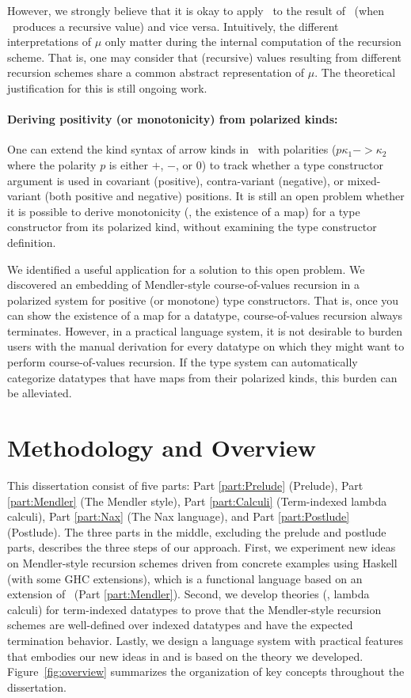 However, we strongly believe that it is okay to apply \MsfIt\ to
the result of \MPr\ (when \MPr\ produces a recursive value) and vice versa.
Intuitively, the different interpretations of $\mu$ only matter during
the internal computation of the recursion scheme. That is, one may consider
that (recursive) values resulting from different recursion schemes
share a common abstract representation of $\mu$.
The theoretical justification for this is still ongoing work.

\paragraph{Deriving positivity (or monotonicity) from polarized kinds:}
One can extend the kind syntax of arrow kinds in \Fw\ with polarities
($p\kappa_1 -> \kappa_2$ where the polarity $p$ is either $+$, $-$, or $0$)
to track whether a type constructor argument is used in
covariant (positive), contra-variant (negative), or
mixed-variant (both positive and negative) positions.
It is still an open problem whether it is possible to derive monotonicity
(\ie, the  existence of a map) for a type constructor from its polarized kind,
without examining the type constructor definition.

We identified a useful application for a solution to this open problem.
We discovered an embedding of Mendler-style course-of-values recursion in
a polarized system for positive (or monotone) type constructors.
That is, once you can show the existence of a map for a datatype,
course-of-values recursion always terminates.
However, in a practical language system, it is not desirable to burden users
with the manual derivation for every datatype on which they might want to
perform course-of-values recursion. If the type system can automatically
categorize datatypes that have maps from their polarized kinds,
this burden can be alleviated.


\section{Methodology and Overview}\label{sec:intro:overview}
This dissertation consist of five parts:
Part \ref{part:Prelude} (Prelude),
Part \ref{part:Mendler} (The Mendler style),
Part \ref{part:Calculi} (Term-indexed lambda calculi),
Part \ref{part:Nax} (The Nax language), and
Part \ref{part:Postlude} (Postlude).
The three parts in the middle, excluding the prelude and postlude parts,
describes the three steps of our approach. First, we experiment new ideas on
Mendler-style recursion schemes driven from concrete examples
using Haskell (with some GHC extensions), which is a functional language
based on an extension of \Fw\ (Part \ref{part:Mendler}). Second, we develop
theories (\ie, lambda calculi) for term-indexed datatypes to prove that
the Mendler-style recursion schemes are well-defined over indexed datatypes
and have the expected termination behavior. Lastly, we design a language system
with practical features that embodies our new ideas in and is based on the
theory we developed. Figure~\ref{fig:overview} summarizes the organization of
key concepts throughout the dissertation.

